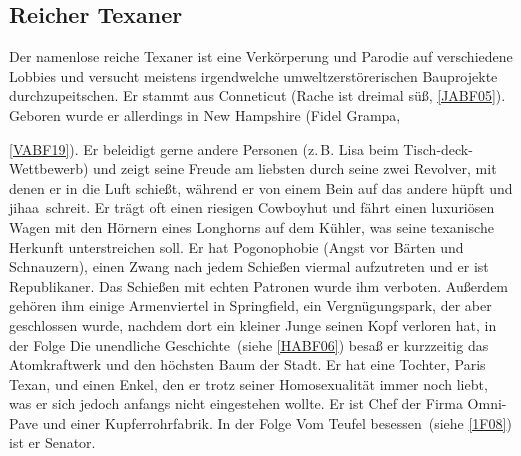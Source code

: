 {\subsection{Reicher Texaner}\label{ReicherTexaner}
Der namenlose reiche Texaner ist eine Verkörperung und Parodie auf verschiedene Lobbies und versucht meistens irgendwelche umweltzerstörerischen Bauprojekte durchzupeitschen. Er stammt aus Conneticut (\glqq Rache ist dreimal süß\grqq , \ref{JABF05}). Geboren wurde er allerdings in New Hampshire (\glqq Fidel Grampa\grqq, }\ref{VABF19}). Er beleidigt gerne andere Personen (z.\,B. Lisa beim Tisch-deck-Wettbewerb) und zeigt seine Freude am liebsten durch seine zwei Revolver, mit denen er in die Luft schießt, während er von einem Bein auf das andere hüpft und \glqq jihaa\grqq\ schreit. Er trägt oft einen riesigen Cowboyhut und fährt einen luxuriösen Wagen mit den Hörnern eines Longhorns auf dem Kühler, was seine texanische Herkunft unterstreichen soll. Er hat Pogonophobie (Angst vor Bärten und Schnauzern), einen Zwang nach jedem Schießen viermal aufzutreten und er ist Republikaner. Das Schießen mit echten Patronen wurde ihm verboten. Außerdem gehören ihm einige Armenviertel in Springfield, ein Vergnügungspark, der aber geschlossen wurde, nachdem dort ein kleiner Junge seinen Kopf verloren hat, in der Folge \glqq Die unendliche Geschichte\grqq\ (siehe \ref{HABF06}) besaß er kurzzeitig das Atomkraftwerk und den höchsten Baum der Stadt. Er hat eine Tochter, Paris Texan, und einen Enkel, den er trotz seiner Homosexualität immer noch liebt, was er sich jedoch anfangs nicht eingestehen wollte. Er ist Chef der Firma Omni-Pave und einer Kupferrohrfabrik. In der Folge \glqq Vom Teufel besessen\grqq\ (siehe \ref{1F08}) ist er Senator.


